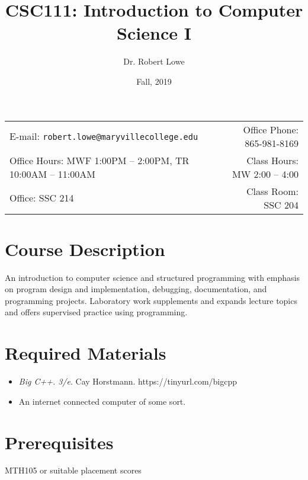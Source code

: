 \documentclass[11pt]{article}
\title{CSC111: Introduction to Computer Science I}
\author{Dr. Robert Lowe}
\date{Fall, 2019}
\newcommand{\blankline}{\quad\pagebreak[2]}
\begin{document}
\maketitle

\blankline

\begin{tabular*}{.93\textwidth}{@{\extracolsep{\fill}}lr}

E-mail: \texttt{robert.lowe@maryvillecollege.edu} & Office Phone: 865-981-8169 \\

 Office Hours: MWF 1:00PM -- 2:00PM, TR 10:00AM -- 11:00AM  &  Class Hours: MW 2:00 -- 4:00\\
 Office: SSC 214 & Class Room: SSC 204\\
\hline
\end{tabular*}

\vspace{5 mm}

\section*{Course Description}
An introduction to computer science and structured programming with
emphasis on program design and implementation, debugging,
documentation, and programming projects. Laboratory work supplements
and expands lecture topics and offers supervised practice using
programming. 


\section*{Required Materials}
\begin{itemize}
    \item {\em Big C++. 3/e}. Cay Horstmann.
    https://tinyurl.com/bigcpp
    \item An internet connected computer of some sort.
\end{itemize}

\section*{Prerequisites}
MTH105 or suitable placement scores
\end{document}
